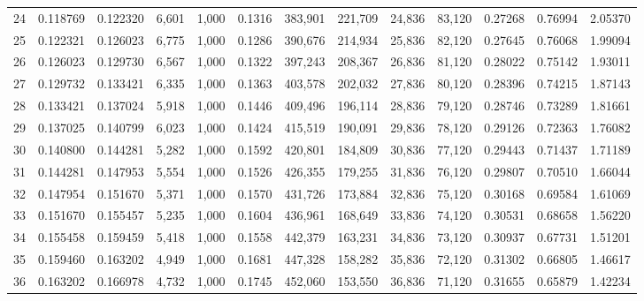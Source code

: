 \begin{tabular}{rrrrrrrrrrrrr}
24  &  0.118769 &  0.122320 &   6,601 &  1,000 &                                     0.1316 &  383,901 &  221,709 &   24,836 &   83,120 &  0.27268 &  0.76994 &  2.05370 \\
25  &  0.122321 &  0.126023 &   6,775 &  1,000 &                                     0.1286 &  390,676 &  214,934 &   25,836 &   82,120 &  0.27645 &  0.76068 &  1.99094 \\
26  &  0.126023 &  0.129730 &   6,567 &  1,000 &                                     0.1322 &  397,243 &  208,367 &   26,836 &   81,120 &  0.28022 &  0.75142 &  1.93011 \\
27  &  0.129732 &  0.133421 &   6,335 &  1,000 &                                     0.1363 &  403,578 &  202,032 &   27,836 &   80,120 &  0.28396 &  0.74215 &  1.87143 \\
28  &  0.133421 &  0.137024 &   5,918 &  1,000 &                                     0.1446 &  409,496 &  196,114 &   28,836 &   79,120 &  0.28746 &  0.73289 &  1.81661 \\
29  &  0.137025 &  0.140799 &   6,023 &  1,000 &                                     0.1424 &  415,519 &  190,091 &   29,836 &   78,120 &  0.29126 &  0.72363 &  1.76082 \\
30  &  0.140800 &  0.144281 &   5,282 &  1,000 &                                     0.1592 &  420,801 &  184,809 &   30,836 &   77,120 &  0.29443 &  0.71437 &  1.71189 \\
31  &  0.144281 &  0.147953 &   5,554 &  1,000 &                                     0.1526 &  426,355 &  179,255 &   31,836 &   76,120 &  0.29807 &  0.70510 &  1.66044 \\
32  &  0.147954 &  0.151670 &   5,371 &  1,000 &                                     0.1570 &  431,726 &  173,884 &   32,836 &   75,120 &  0.30168 &  0.69584 &  1.61069 \\
33  &  0.151670 &  0.155457 &   5,235 &  1,000 &                                     0.1604 &  436,961 &  168,649 &   33,836 &   74,120 &  0.30531 &  0.68658 &  1.56220 \\
34  &  0.155458 &  0.159459 &   5,418 &  1,000 &                                     0.1558 &  442,379 &  163,231 &   34,836 &   73,120 &  0.30937 &  0.67731 &  1.51201 \\
35  &  0.159460 &  0.163202 &   4,949 &  1,000 &                                     0.1681 &  447,328 &  158,282 &   35,836 &   72,120 &  0.31302 &  0.66805 &  1.46617 \\
36  &  0.163202 &  0.166978 &   4,732 &  1,000 &                                     0.1745 &  452,060 &  153,550 &   36,836 &   71,120 &  0.31655 &  0.65879 &  1.42234 \\

\end{tabular}
